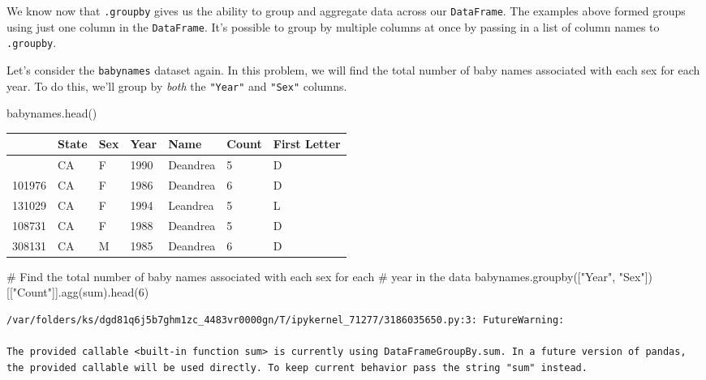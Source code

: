 \documentclass[
  letterpaper,
  DIV=11,
  numbers=noendperiod]{scrreprt}
\newenvironment{Shaded}{\begin{snugshade}}{\end{snugshade}}
\newcommand{\BuiltInTok}[1]{\textcolor[rgb]{0.00,0.23,0.31}{#1}}
\newcommand{\CommentTok}[1]{\textcolor[rgb]{0.37,0.37,0.37}{#1}}
\newcommand{\DecValTok}[1]{\textcolor[rgb]{0.68,0.00,0.00}{#1}}
\newcommand{\NormalTok}[1]{\textcolor[rgb]{0.00,0.23,0.31}{#1}}
\newcommand{\StringTok}[1]{\textcolor[rgb]{0.13,0.47,0.30}{#1}}
\begin{document}
We know now that \texttt{.groupby} gives us the ability to group and
aggregate data across our \texttt{DataFrame}. The examples above formed
groups using just one column in the \texttt{DataFrame}. It's possible to
group by multiple columns at once by passing in a list of column names
to \texttt{.groupby}.

Let's consider the \texttt{babynames} dataset again. In this problem, we
will find the total number of baby names associated with each sex for
each year. To do this, we'll group by \emph{both} the \texttt{"Year"}
and \texttt{"Sex"} columns.

\begin{Shaded}
\begin{Highlighting}[]
\NormalTok{babynames.head()}
\end{Highlighting}
\end{Shaded}

\begin{longtable}[]{@{}lllllll@{}}
\toprule\noalign{}
& State & Sex & Year & Name & Count & First Letter \\
\midrule\noalign{}
\endhead
\bottomrule\noalign{}
\endlastfoot
115957 & CA & F & 1990 & Deandrea & 5 & D \\
101976 & CA & F & 1986 & Deandrea & 6 & D \\
131029 & CA & F & 1994 & Leandrea & 5 & L \\
108731 & CA & F & 1988 & Deandrea & 5 & D \\
308131 & CA & M & 1985 & Deandrea & 6 & D \\
\end{longtable}

\begin{Shaded}
\begin{Highlighting}[]
\CommentTok{\# Find the total number of baby names associated with each sex for each }
\CommentTok{\# year in the data}
\NormalTok{babynames.groupby([}\StringTok{"Year"}\NormalTok{, }\StringTok{"Sex"}\NormalTok{])[[}\StringTok{"Count"}\NormalTok{]].agg(}\BuiltInTok{sum}\NormalTok{).head(}\DecValTok{6}\NormalTok{)}
\end{Highlighting}
\end{Shaded}

\begin{verbatim}
/var/folders/ks/dgd81q6j5b7ghm1zc_4483vr0000gn/T/ipykernel_71277/3186035650.py:3: FutureWarning:

The provided callable <built-in function sum> is currently using DataFrameGroupBy.sum. In a future version of pandas, the provided callable will be used directly. To keep current behavior pass the string "sum" instead.
\end{verbatim}
\end{document}

